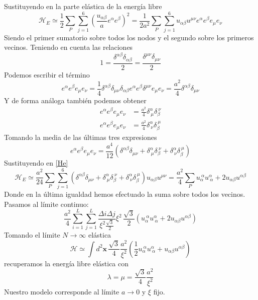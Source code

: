 Sustituyendo en la parte elástica de la energía libre
\begin{equation}\label{He}
\mathcal{H}_E\simeq \frac{1}{2}\sum_{P} \sum^6_{j=1} \left(\frac{u_{\alpha\beta}}{a}e^{\alpha}e^{\beta}\right)^2=\frac{1}{2a^2}\sum_{P} \sum^6_{j=1} u_{\alpha\beta}u^{\mu\nu}e^{\alpha}e^{\beta}e_{\mu}e_{\nu}
\end{equation}
Siendo el primer sumatorio sobre todos los nodos y el segundo sobre los
primeros vecinos. Teniendo en cuenta las relaciones
\begin{equation}
1=\frac{\delta^{\alpha\beta}\delta_{\alpha\beta}}{2}=\frac{\delta^{\mu\nu}\delta_{\mu\nu}}{2}
\end{equation}
Podemos escribir el término
\begin{equation}
e^{\alpha}e^{\beta}e_{\mu}e_{\nu}=\frac{1}{4}\delta^{\alpha\beta}\delta_{\mu\nu}\delta_{\alpha\beta}e^{\alpha}e^{\beta}\delta^{\mu\nu}e_{\mu}e_{\nu}=\frac{a^2}{4}\delta^{\alpha\beta}\delta_{\mu\nu}
\end{equation}
Y de forma análoga también podemos obtener
\begin{align}
e^{\alpha}e^{\beta}e_{\mu}e_{\nu}&=\frac{a^2}{4}\delta^{\alpha}_{\ \mu}\delta_{\beta}^{\
  \nu}\\
e^{\alpha}e^{\beta}e_{\mu}e_{\nu}&=\frac{a^2}{4}\delta^{\alpha}_{\ \nu}\delta_{\beta}^{\
  \mu}
\end{align}
Tomando la media de las últimas tres expresiones
\begin{equation}
e^{\alpha}e^{\beta}e_{\mu}e_{\nu}=\frac{a^4}{12}(\delta^{\alpha\beta}\delta_{\mu\nu}+
\delta^{\alpha}_{\ \mu}\delta_{\beta}^{\ \nu}+
\delta^{\alpha}_{\ \nu}\delta_{\beta}^{\ \mu})
\end{equation}
Sustituyendo en \eqref{He}
\begin{equation}
\mathcal{H}_E\simeq\frac{a^2}{24}\sum_{P} \sum^6_{j=1}(\delta^{\alpha\beta}\delta_{\mu\nu}+\delta^{\alpha}_{\ \mu}\delta_{\beta}^{\ \nu}+
\delta^{\alpha}_{\ \nu}\delta_{\beta}^{\ \mu})
u_{\alpha\beta}u^{\mu\nu}=\frac{a^2}{4}\sum_{P}u_{\alpha}^{\ \alpha}u^{\alpha}_{\ \alpha}+2u_{\alpha\beta}u^{\alpha\beta}
\end{equation}
Donde en  la última igualdad hemos efectuado la suma sobre todos los vecinos.
Pasamos al límite continuo:
\begin{equation}
\frac{a^2}{4}\sum_{i=1}^L\sum_{j=1}^L\frac{\Delta i\Delta j}{\xi^2\frac{\sqrt{3}}{2}}\xi^2\,\frac{\sqrt{3}}{2}(u_{\alpha}^{\ \alpha}u^{\alpha}_{\ \alpha}+2u_{\alpha\beta}u^{\alpha\beta})
\end{equation}
Tomando el límite $N\rightarrow \infty$
elástica 
\begin{equation}
\mathcal{H}\simeq\int d^2\mathbf{x}\, \frac{\sqrt{3}}{4}\frac{a^2}{\xi^2}\left(\frac{1}{2}u_{\alpha}^{\ \alpha}u^{\alpha}_{\ \alpha}+u_{\alpha\beta}u^{\alpha\beta}\right)
\end{equation}
recuperamos la energía libre elástica con 
\begin{equation}
\lambda=\mu=\frac{\sqrt{3}}{4}\frac{a^2}{\xi^2}
\end{equation}
Nuestro modelo corresponde al límite $a\rightarrow 0$ y $\xi$ fijo.


